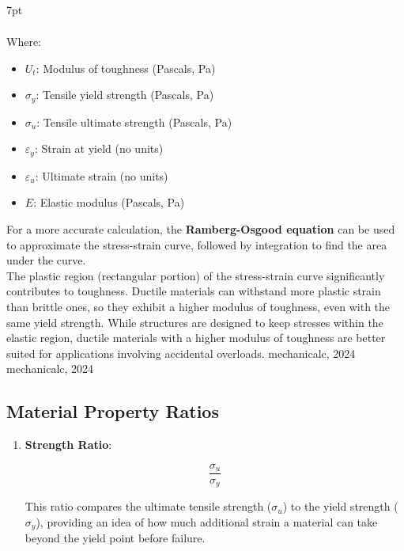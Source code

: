 \documentclass{article}
\newcommand{\formalsource}{} %
\newenvironment{formal}[1][]{%
	\renewcommand{\formalsource}{#1}%
	\def\FrameCommand{%
		\hspace{1pt}%
		{\color{gray}\vrule width 2pt}%
		{\color{white}\vrule width 4pt}%
		\colorbox{white}%
	}%
	\MakeFramed{\advance\hsize-\width\FrameRestore}%
	\noindent\hspace{-4.55pt}%
	\begin{adjustwidth}{}{7pt}%
		\vspace{2pt}%
	}%
	{%
		\vspace{4pt}%
		\ifx\formalsource\empty %
		\else
		\hfill{\footnotesize{\formalsource}}%
		\fi
	\end{adjustwidth}\endMakeFramed%
}
\begin{document}
{\begin{formal}[mechanicalc, 2024]
\begin{center}
\begin{minipage}{0.45\textwidth}
\begin{equation}
\begin{aligned}
            \end{aligned}
        \end{equation}
        Where:
        \begin{itemize}[left=0pt, itemsep=-1mm]
            \item \( U_t \): Modulus of toughness (Pascals, Pa)
            \item $\sigma_y$: Tensile yield strength (Pascals, Pa)
            \item $\sigma_u$: Tensile ultimate strength (Pascals, Pa)
            \item $\varepsilon_y$: Strain at yield (no units)
            \item $\varepsilon_u$: Ultimate strain (no units)
            \item $E$: Elastic modulus (Pascals, Pa)
        \end{itemize}
    \end{minipage}
\end{center}
For a more accurate calculation, the \textbf{Ramberg-Osgood equation} can be used to approximate the stress-strain curve, followed by integration to find the area under the curve.\\[8pt]
The plastic region (rectangular portion) of the stress-strain curve significantly contributes to toughness. Ductile materials can withstand more plastic strain than brittle ones, so they exhibit a higher modulus of toughness, even with the same yield strength. While structures are designed to keep stresses within the elastic region, ductile materials with a higher modulus of toughness are better suited for applications involving accidental overloads.
\end{formal}

\newpage

\subsection{Material Property Ratios}\label{mpr}
\vspace{0.5em}
\begin{enumerate}
    
    \item \textbf{Strength Ratio}:\\[8pt]
    \begin{minipage}{0.3\textwidth}
        \begin{equation}
            \frac{\sigma_u}{\sigma_y}
        \end{equation}
    \end{minipage}\hfill
    \begin{minipage}{0.6\textwidth}
        This ratio compares the ultimate tensile strength (\(\sigma_u\)) to the yield strength (\(\sigma_y\)), providing an idea of how much additional strain a material can take beyond the yield point before failure.
    \end{minipage}
    

\end{enumerate}}
\end{document}
